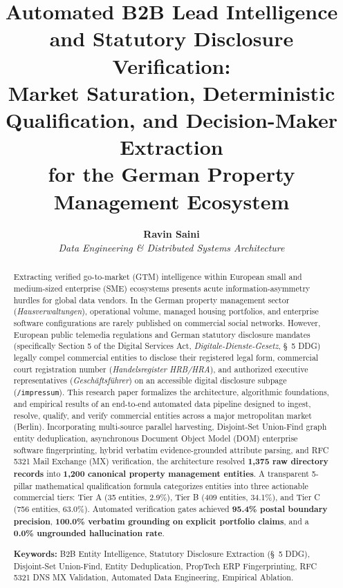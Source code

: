 \documentclass[11pt,a4paper]{article}
\title{\textbf{\Large Automated B2B Lead Intelligence and Statutory Disclosure Verification:\\
Market Saturation, Deterministic Qualification, and Decision-Maker Extraction\\
for the German Property Management Ecosystem}}
\author{\textbf{Ravin Saini}\\
\small \textit{Data Engineering \& Distributed Systems Architecture}}
\date{}
\begin{document}
\maketitle
\thispagestyle{fancy}

\begin{abstract}
\noindent Extracting verified go-to-market (GTM) intelligence within European small and medium-sized enterprise (SME) ecosystems presents acute information-asymmetry hurdles for global data vendors. In the German property management sector (\textit{Hausverwaltungen}), operational volume, managed housing portfolios, and enterprise software configurations are rarely published on commercial social networks. However, European public telemedia regulations and German statutory disclosure mandates (specifically Section 5 of the Digital Services Act, \textit{Digitale-Dienste-Gesetz}, \S~5 DDG) legally compel commercial entities to disclose their registered legal form, commercial court registration number (\textit{Handelsregister HRB/HRA}), and authorized executive representatives (\textit{Gesch\"aftsf\"uhrer}) on an accessible digital disclosure subpage (\texttt{/impressum}). This research paper formalizes the architecture, algorithmic foundations, and empirical results of an end-to-end automated data pipeline designed to ingest, resolve, qualify, and verify commercial entities across a major metropolitan market (Berlin). Incorporating multi-source parallel harvesting, Disjoint-Set Union-Find graph entity deduplication, asynchronous Document Object Model (DOM) enterprise software fingerprinting, hybrid verbatim evidence-grounded attribute parsing, and RFC 5321 Mail Exchange (MX) verification, the architecture resolved \textbf{1,375 raw directory records} into \textbf{1,200 canonical property management entities}. A transparent 5-pillar mathematical qualification formula categorizes entities into three actionable commercial tiers: Tier A (35 entities, 2.9\%), Tier B (409 entities, 34.1\%), and Tier C (756 entities, 63.0\%). Automated verification gates achieved \textbf{95.4\% postal boundary precision}, \textbf{100.0\% verbatim grounding on explicit portfolio claims}, and a \textbf{0.0\% ungrounded hallucination rate}.

\vspace{5pt}
\noindent \textbf{Keywords:} B2B Entity Intelligence, Statutory Disclosure Extraction (\S~5 DDG), Disjoint-Set Union-Find, Entity Deduplication, PropTech ERP Fingerprinting, RFC 5321 DNS MX Validation, Automated Data Engineering, Empirical Ablation.
\end{abstract}
\end{document}
